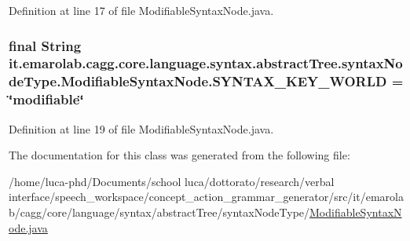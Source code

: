 Definition at line 17 of file Modifiable\-Syntax\-Node.\-java.

\hypertarget{classit_1_1emarolab_1_1cagg_1_1core_1_1language_1_1syntax_1_1abstractTree_1_1syntaxNodeType_1_1ModifiableSyntaxNode_aba4534f1981ddc98a298f479bd7527e9}{
\subsubsection[{S\-Y\-N\-T\-A\-X\-\_\-\-K\-E\-Y\-\_\-\-W\-O\-R\-L\-D}]{\setlength{\rightskip}{0pt plus 5cm}final String it.\-emarolab.\-cagg.\-core.\-language.\-syntax.\-abstract\-Tree.\-syntax\-Node\-Type.\-Modifiable\-Syntax\-Node.\-S\-Y\-N\-T\-A\-X\-\_\-\-K\-E\-Y\-\_\-\-W\-O\-R\-L\-D = \char`\"{}modifiable\char`\"{}\hspace{0.3cm}{\ttfamily [static]}}}\label{classit_1_1emarolab_1_1cagg_1_1core_1_1language_1_1syntax_1_1abstractTree_1_1syntaxNodeType_1_1ModifiableSyntaxNode_aba4534f1981ddc98a298f479bd7527e9}


Definition at line 19 of file Modifiable\-Syntax\-Node.\-java.



The documentation for this class was generated from the following file\-:\begin{DoxyCompactItemize}
\item 
/home/luca-\/phd/\-Documents/school luca/dottorato/research/verbal interface/speech\-\_\-workspace/concept\-\_\-action\-\_\-grammar\-\_\-generator/src/it/emarolab/cagg/core/language/syntax/abstract\-Tree/syntax\-Node\-Type/\hyperlink{ModifiableSyntaxNode_8java}{Modifiable\-Syntax\-Node.\-java}\end{DoxyCompactItemize}
